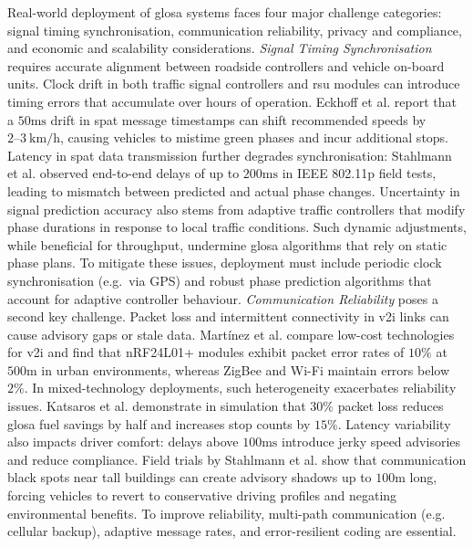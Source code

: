 Real-world deployment of \ac{glosa} systems faces four major challenge categories: signal timing synchronisation, communication reliability, privacy and compliance, and economic and scalability considerations.
\mynewline
\textit{Signal Timing Synchronisation} requires accurate alignment between roadside controllers and vehicle on-board units. Clock drift in both traffic signal controllers and \ac{rsu} modules can introduce timing errors that accumulate over hours of operation. Eckhoff et al. \cite{Eckhoff2013} report that a $50\unit{\milli\second}$ drift in \ac{spat} message timestamps can shift recommended speeds by $2\text{--}3~\unit{\kilo\metre\per\hour}$, causing vehicles to mistime green phases and incur additional stops. Latency in \ac{spat} data transmission further degrades synchronisation: Stahlmann et al. \cite{Stahlmann2018} observed end-to-end delays of up to $\unit{200\milli\second}$ in IEEE 802.11p field tests, leading to mismatch between predicted and actual phase changes. Uncertainty in signal prediction accuracy also stems from adaptive traffic controllers that modify phase durations in response to local traffic conditions. Such dynamic adjustments, while beneficial for throughput, undermine \ac{glosa} algorithms that rely on static phase plans. To mitigate these issues, deployment must include periodic clock synchronisation (e.g.\ via GPS) and robust phase prediction algorithms that account for adaptive controller behaviour.
\mynewline
\textit{Communication Reliability} poses a second key challenge. Packet loss and intermittent connectivity in \ac{v2i} links can cause advisory gaps or stale data. Martínez et al. \cite{Martinez2020} compare low-cost technologies for \ac{v2i} and find that nRF24L01+ modules exhibit packet error rates of $10\%$ at $500\unit{\meter}$ in urban environments, whereas ZigBee and Wi-Fi maintain errors below $2\%$. In mixed-technology deployments, such heterogeneity exacerbates reliability issues. Katsaros et al. \cite{Katsaros2011} demonstrate in simulation that $30\%$ packet loss reduces \ac{glosa} fuel savings by half and increases stop counts by $15\%$. Latency variability also impacts driver comfort: delays above $\unit{100\milli\second}$ introduce jerky speed advisories and reduce compliance. Field trials by Stahlmann et al. \cite{Stahlmann2018} show that communication black spots near tall buildings can create advisory shadows up to $\unit{100\meter}$ long, forcing vehicles to revert to conservative driving profiles and negating environmental benefits. To improve reliability, multi-path communication (e.g. cellular backup), adaptive message rates, and error-resilient coding are essential.
